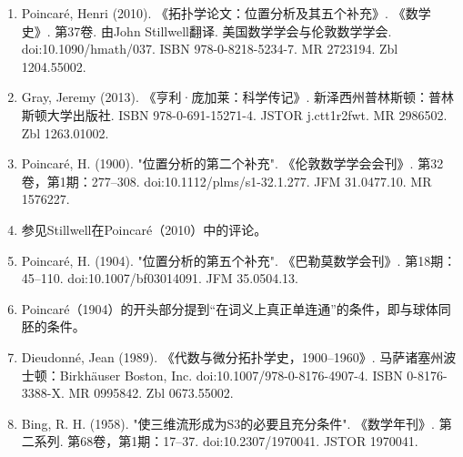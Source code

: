 \begin{enumerate}
\item Poincaré, Henri (2010). 《拓扑学论文：位置分析及其五个补充》. 《数学史》. 第37卷. 由John Stillwell翻译. 美国数学学会与伦敦数学学会. doi:10.1090/hmath/037. ISBN 978-0-8218-5234-7. MR 2723194. Zbl 1204.55002.  
\item Gray, Jeremy (2013). 《亨利·庞加莱：科学传记》. 新泽西州普林斯顿：普林斯顿大学出版社. ISBN 978-0-691-15271-4. JSTOR j.ctt1r2fwt. MR 2986502. Zbl 1263.01002.  
\item Poincaré, H. (1900). "位置分析的第二个补充". 《伦敦数学学会会刊》. 第32卷，第1期：277–308. doi:10.1112/plms/s1-32.1.277. JFM 31.0477.10. MR 1576227.  
\item 参见Stillwell在Poincaré（2010）中的评论。  
\item Poincaré, H. (1904). "位置分析的第五个补充". 《巴勒莫数学会刊》. 第18期：45–110. doi:10.1007/bf03014091. JFM 35.0504.13.  
\item Poincaré（1904）的开头部分提到“在词义上真正单连通”的条件，即与球体同胚的条件。
\item Dieudonné, Jean (1989). 《代数与微分拓扑学史，1900–1960》. 马萨诸塞州波士顿：Birkhäuser Boston, Inc. doi:10.1007/978-0-8176-4907-4. ISBN 0-8176-3388-X. MR 0995842. Zbl 0673.55002.  
\item Bing, R. H. (1958). "使三维流形成为S3的必要且充分条件". 《数学年刊》. 第二系列. 第68卷，第1期：17–37. doi:10.2307/1970041. JSTOR 1970041.
\end{enumerate}